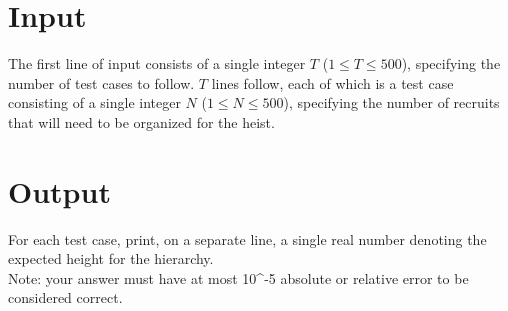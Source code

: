 \section*{Input}
The first line of input consists of a single integer $T$ ($1 \leq T \leq 500$), specifying the number of test cases to follow.
$T$ lines follow, each of which is a test case consisting of a single integer $N$ ($1 \leq N \leq 500$), specifying the number of recruits that will need to be organized for the heist.\\

\section*{Output}
For each test case, print, on a separate line, a single real number denoting the expected height for the hierarchy.\\
Note: your answer must have at most 10^{-5} absolute or relative error to be considered correct.
